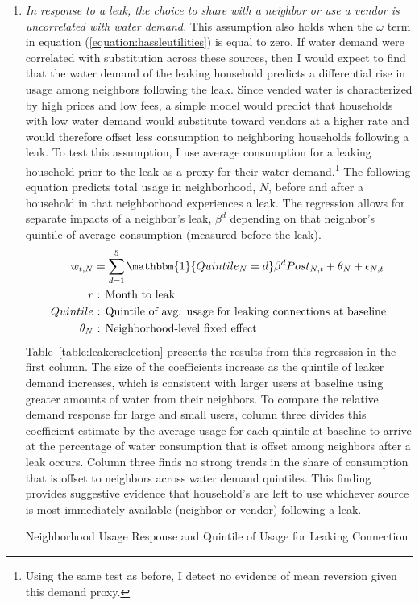\documentclass[12pt]{article}
\begin{document}
\begin{appendices}
\begin{enumerate}
\begin{table}
\centering
\caption{Leak Demand Response and Rank of Baseline Usage in Neighborhood}
\label{table:neighborselection}
\end{table}
	\item \textit{ In response to a leak, the choice to share with a neighbor or use a vendor is uncorrelated with water demand. }  This assumption also holds when the $\omega$ term in equation (\ref{equation:hassleutilities}) is equal to zero.  If water demand were correlated with substitution across these sources, then I would expect to find that the water demand of the leaking household predicts a differential rise in usage among neighbors following the leak.  Since vended water is characterized by high prices and low fees, a simple model would predict that households with low water demand would substitute toward vendors at a higher rate and would therefore offset less consumption to neighboring households following a leak.  To test this assumption, I use average consumption for a leaking household prior to the leak as a proxy for their water demand.\footnote{Using the same test as before, I detect no evidence of mean reversion given this demand proxy.}  The following equation predicts total usage in neighborhood, $N$, before and after a household in that neighborhood experiences a leak.  The regression allows for separate impacts of a neighbor's leak, $\beta^d$ depending on that neighbor's quintile of average consumption (measured before the leak).
\begin{align*}
	w_{t,N} &= \sum_{d=1}^{5} \mathbbm{1}\{Quintile_{N}=d\}  \beta^{d} Post_{N,t}  + \theta_{N}  + \epsilon_{N,t}\\
r &\text{ : Month to leak} \\
Quintile &\text{ : Quintile of avg. usage for leaking connections at baseline} \\
\theta_N &\text{ : Neighborhood-level fixed effect}
\end{align*}
	Table~\ref{table:leakerselection} presents the results from this regression in the first column.  The size of the coefficients increase as the quintile of leaker demand increases, which is consistent with larger users at baseline using greater amounts of water from their neighbors.  To compare the relative demand response for large and small users, column three divides this coefficient estimate by the average usage for each quintile at baseline to arrive at the percentage of water consumption that is offset among neighbors after a leak occurs.  Column three finds no strong trends in the share of consumption that is offset to neighbors across water demand quintiles.  This finding provides suggestive evidence that household's are left to use whichever source is most immediately available (neighbor or vendor) following a leak.
\begin{table}
\centering
\caption{Neighborhood Usage Response and Quintile of Usage for Leaking Connection}\label{table:leakerselection}

\end{table}


\end{enumerate}
\end{appendices}
\end{document}
